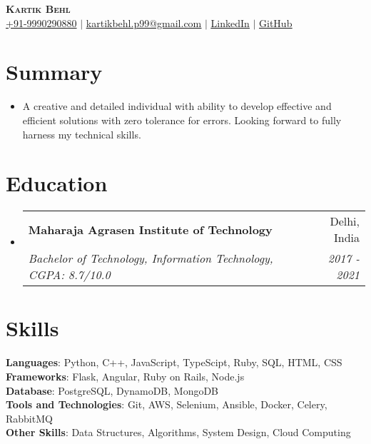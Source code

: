 \documentclass[letterpaper,11pt]{article}
\makeatletter
\newcommand{\resumeItem}[1]{
  \item\small{
    {#1 \vspace{-2pt}}
  }
}
\newcommand{\resumeSubheading}[4]{
  \vspace{-2pt}\item
    \begin{tabular*}{0.97\textwidth}[t]{l@{\extracolsep{\fill}}r}
      \textbf{#1} & #2 \\
      \textit{\small#3} & \textit{\small #4} \\
    \end{tabular*}\vspace{-7pt}
}
\newcommand{\resumeSubHeadingListStart}{\begin{itemize}[leftmargin=0.15in, label={}]}
\newcommand{\resumeSubHeadingListEnd}{\end{itemize}}
\makeatother
\begin{document}

\begin{center}
    \textbf{\Huge \scshape Kartik Behl} \\ \vspace{1pt}
    \small \href{tel:9990290880}{+91-9990290880} $|$ \href{mailto:kartikbehl.p99@gmail.com}{\underline{kartikbehl.p99@gmail.com}} $|$ 
    \href{https://www.linkedin.com/in/kartik-b-b46a3484/}{\underline{LinkedIn}} $|$
    \href{https://github.com/kartikbehl99}{\underline{GitHub}}
\end{center}


\section{Summary}
\resumeSubHeadingListStart
\resumeItem{A creative and detailed individual with ability to develop effective and efficient solutions with zero tolerance for errors. Looking forward to fully harness my technical skills.}
\resumeSubHeadingListEnd


\section{Education}
  \resumeSubHeadingListStart
    \resumeSubheading
      {Maharaja Agrasen Institute of Technology}{Delhi, India}
      {Bachelor of Technology, Information Technology, CGPA: 8.7/10.0}{2017 - 2021}
  \resumeSubHeadingListEnd


\section{Skills}
 \begin{itemize}[leftmargin=0.15in, label={}]
    \small{\item{
     \textbf{Languages}{: Python, C++, JavaScript, TypeScipt, Ruby, SQL, HTML, CSS} \\
     \textbf{Frameworks}{: Flask, Angular, Ruby on Rails, Node.js} \\
     \textbf{Database}{: PostgreSQL, DynamoDB, MongoDB} \\
     \textbf{Tools and Technologies}{: Git, AWS, Selenium, Ansible, Docker, Celery, RabbitMQ} \\
     \textbf{Other Skills}{: Data Structures, Algorithms, System Design, Cloud Computing} \\
    }}
 \end{itemize}
\end{document}
